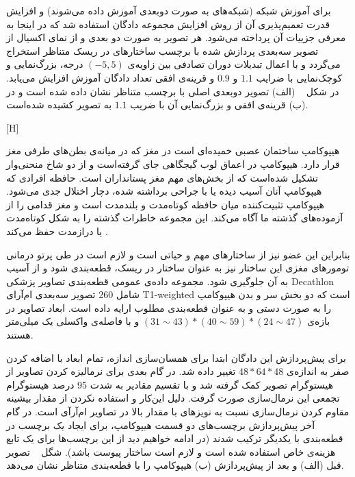 برای آموزش شبکه (شبکه‌های به صورت دوبعدی آموزش داده می‌شوند) و افزایش قدرت تعمیم‌پذیری آن از روش افزایش مجموعه دادگان استفاده شد که در اینجا به معرفی جزییات آن پرداخته می‌شود. هر تصویر به صورت دو بعدی و از نمای اکسیال از تصویر سه‌بعدی پردازش شده با برچسب ساختارهای در ریسک متناظر استخراج می‌گردد و با اعمال تبدیلات دوران تصادفی بین زاویه‌ی $(-5,5)$ درجه، بزرگ‌نمایی و کوچک‌نمایی با ضرایب $1.1$ و $0.9$ و قرینه‌ی افقی تعداد دادگان آموزش افزایش می‌یابد. در شکل ~ (الف) تصویر دوبعدی اصلی با برچسب‌ متناظر نشان داده شده است و در (ب) قرینه‌ی افقی و بزرگ‌نمایی آن با ضریب $1.1$ به تصویر کشیده شده‌است.

[H]


هیپوکامپ ساختمان عصبی خمیده‌ای است در مغز که در میانه‌ی بطن‌های طرفی مغز قرار دارد. هیپوکامپ در اعماق لوب گیجگاهی جای گرفته‌است و از دو شاخ منحنی‌وار تشکیل شده‌است که از بخش‌های مهم مغز پستانداران است. حافظه افرادی که هیپوکامپ آنان آسیب دیده یا با جراحی برداشته شده، دچار اختلال جدی می‌شود. هیپوکامپ تثبیت‌کننده میان حافظه کوتاه‌مدت و بلندمدت است و مغز قدامی را از آزموده‌های گذشته ما آگاه می‌کند. این مجموعه خاطرات گذشته را به شکل کوتاه‌مدت یا درازمدت حفظ می‌کند . 

بنابراین این عضو نیز از ساختارهای مهم و حیاتی است و لازم است در طی پرتو درمانی تومورهای مغزی این ساختار نیز به عنوان ساختار در ریسک، قطعه‌بندی شود و از آسیب به آن جلوگیری شود. مجموعه داده‌ی عمومی قطعه‌بندی تصاویر پزشکی Decathlon  شامل 260 تصویر سه‌بعدی ام‌آرای T1-weighted است که دو بخش سر و بدن هیپوکامپ را به صورت دستی و به عنوان قطعه‌بندی مطلوب ارایه داده است. ابعاد تصاویر در بازه‌ی 
$(31\sim43)*(40\sim59)*(24\sim47)$
و با فاصله‌ی واکسلی یک میلی‌متر هستند. 

برای پیش‌پردازش این دادگان ابتدا برای همسان‌سازی اندازه، تمام ابعاد با اضافه کردن صفر به اندازه‌ی $48*64*48$ تغییر داده شد. در گام‌ بعدی برای نرمالیزه کردن تصاویر از هیستوگرام تصویر کمک گرفته شد و با تقسیم مقادیر به شدت 95 درصد هیستوگرام تجمعی این نرمال‌سازی صورت گرفت. دلیل این‌کار و استفاده نکردن از مقدار بیشینه مقاوم کردن نرمال‌سازی نسبت به نویزهای با مقدار بالا در تصاویر ام‌آرآی است. در گام آخر پیش‌پردازش برچسب‌های دو قسمت هیپوکامپ، برای ایجاد یک برچسب در قطعه‌بندی با یکدیگر ترکیب شدند (در ادامه خواهیم دید از این برچسب‌ها برای یک تابع هزینه‌ی خاص استفاده شده است و لازم است ساختار پیوست باشد). شگل ~ تصویر قبل (الف) و بعد از پیش‌پردازش (ب) هیپوکامپ را با قطعه‌بندی متناظر نشان می‌دهد.

